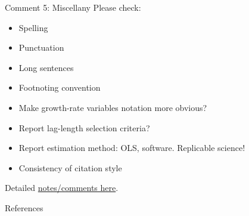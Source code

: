 \documentclass[10pt,english,slidetop,compress,
              blue,mathserif,color=option]{beamer}
\def\linkcomment{https://github.com/phantomachine/discussion_VAR-LKA}
\theoremstyle{plain}
\theoremstyle{definition}
\begin{document}
\begin{frame}{Comment 5: Miscellany}
  Please check:
  \begin{itemize}
    \item Spelling
    \item Punctuation
    \item Long sentences
    \item Footnoting convention
    \item Make growth-rate variables notation more obvious?
    \item Report lag-length selection criteria?
    \item Report estimation method: OLS, software. Replicable science!
    \item Consistency of citation style
  \end{itemize}

  Detailed \href{\linkcomment}{notes/comments here}.
\end{frame}

\begin{frame}{References}
  \begin{smaller}
    \printbibliography
  \end{smaller}
\end{frame}
\end{document}
